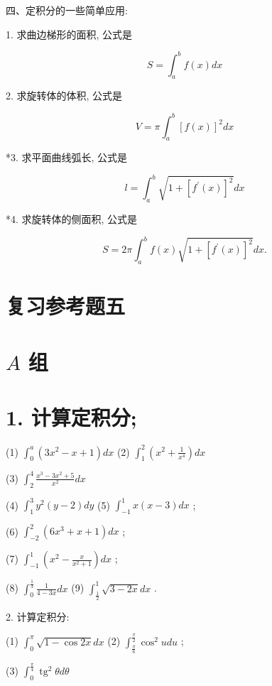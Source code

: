 \documentclass[10pt]{article}
\begin{document}
四、定积分的一些简单应用:

1. 求曲边梯形的面积, 公式是

\[
S = {\int }_{a}^{b}f\left( x\right) {dx}
\]

2. 求旋转体的体积, 公式是

\[
V = \pi {\int }_{a}^{b}{\left\lbrack f\left( x\right) \right\rbrack }^{2}{dx}
\]

*3. 求平面曲线弧长, 公式是

\[
l = {\int }_{a}^{b}\sqrt{1 + {\left\lbrack {f}^{\prime }\left( x\right) \right\rbrack }^{2}}{dx}
\]

*4. 求旋转体的侧面积, 公式是

\[
S = {2\pi }{\int }_{a}^{b}f\left( x\right) \sqrt{1 + {\left\lbrack {f}^{\prime }\left( x\right) \right\rbrack }^{2}}{dx}.
\]

\section*{复习参考题五}

\section*{\(A\) 组}

\section*{1. 计算定积分;}

(1) \({\int }_{0}^{a}\left( {3{x}^{2} - x + 1}\right) {dx}\) (2) \({\int }_{1}^{2}\left( {{x}^{2} + \frac{1}{{x}^{4}}}\right) {dx}\)

(3) \({\int }_{2}^{4}\frac{{x}^{3} - 3{x}^{2} + 5}{{x}^{2}}{dx}\)

(4) \({\int }_{1}^{3}{y}^{2}\left( {y - 2}\right) {dy}\) (5) \({\int }_{-1}^{1}x\left( {x - 3}\right) {dx}\) ;

(6) \({\int }_{-2}^{2}\left( {6{x}^{3} + x + 1}\right) {dx}\) ;

(7) \({\int }_{-1}^{1}\left( {{x}^{2} - \frac{x}{{x}^{2} + 1}}\right) {dx}\) ;

(8) \({\int }_{0}^{\frac{1}{3}}\frac{1}{4 - {3x}}{dx}\) (9) \({\int }_{\frac{1}{2}}^{1}\sqrt{3 - {2x}}{dx}\) .

2. 计算定积分:

(1) \({\int }_{0}^{\pi }\sqrt{1 - \cos {2x}}{dx}\) (2) \({\int }_{\frac{\pi }{6}}^{\frac{\pi }{2}}{\cos }^{2}{udu}\) ;

(3) \({\int }_{0}^{\frac{\pi }{4}}{\operatorname{tg}}^{2}{\theta d\theta }\)
\end{document}
